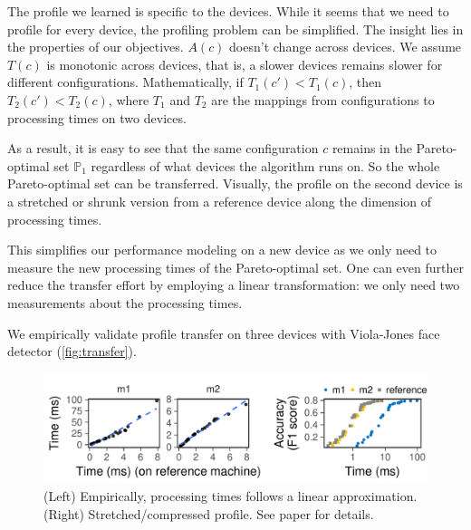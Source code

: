 The profile we learned is specific to the devices. While it seems that we need
to profile for every device, the profiling problem can be simplified. The
insight lies in the properties of our objectives. $A(c)$ doesn't change across
devices. We assume $T(c)$ is monotonic across devices, that is, a slower devices
remains slower for different configurations. Mathematically, if
$T_1(c') < T_1(c)$, then $T_2(c') < T_2(c)$, where $T_1$ and $T_2$ are the
mappings from configurations to processing times on two devices.

As a result, it is easy to see that the same configuration $c$ remains in the
Pareto-optimal set $\mathbb{P}_1$ regardless of what devices the algorithm runs
on. So the whole Pareto-optimal set can be transferred. Visually, the profile on
the second device is a stretched or shrunk version from a reference device along
the dimension of processing times.

This simplifies our performance modeling on a new device as we only need to
measure the new processing times of the Pareto-optimal set. One can even further
reduce the transfer effort by employing a linear transformation: we only need
two measurements about the processing times.

We empirically validate profile transfer on three devices with Viola-Jones face
detector (\autoref{fig:transfer}).

\begin{figure}
  \centering
  \includegraphics[width=0.9\linewidth]{figures/serving-cross-platform.pdf}
  \caption{(Left) Empirically, processing times follows a linear
    approximation. (Right) Stretched/compressed profile. See paper for
    details.}
  \label{fig:transfer}
\end{figure}


